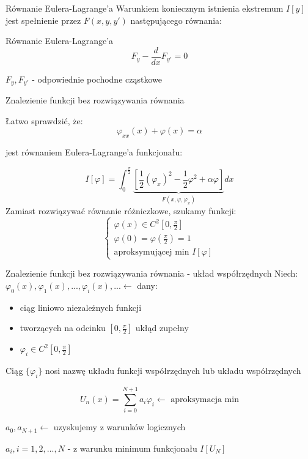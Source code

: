 
	\begin{frame}{Równanie Eulera-Lagrange'a}
		Warunkiem koniecznym istnienia ekstremum $I[y]$ jest spełnienie przez $F(x,y,y')$ następującego równania:
		
		\begin{block}{Równanie Eulera-Lagrange'a}
			$$
			F_y - \frac{d}{dx} F_{y'} = 0
			$$
			
			$F_y , F_{y'}$ - odpowiednie pochodne cząstkowe
		\end{block}
		
		
		
	\end{frame}


	\begin{frame}{Znalezienie funkcji bez rozwiązywania równania}
	
		Łatwo sprawdzić, że:
		$$
		\varphi_{xx}(x) + \varphi(x) = \alpha
		$$
				
		jest równaniem Eulera-Lagrange'a funkcjonału:
				
		$$
		I[\varphi] = \int_0^{\frac{\pi}{2}} \underbrace{[\frac{1}{2}(\varphi_x)^2 - \frac{1}{2}\varphi^2 + \alpha \varphi]}_{F(x,\varphi, \varphi_x)} dx
		$$
		Zamiast rozwiązywać równanie różniczkowe, szukamy funkcji:
		$$
		\begin{cases}
			\varphi(x) \in C^2[0, \frac{\pi}{2}] \\
			\varphi(0) = \varphi(\frac{\pi}{2}) = 1 \\
			\text{aproksymującej min } I[\varphi]
		\end{cases}
		$$		
	\end{frame}
	

	\begin{frame}{Znalezienie funkcji bez rozwiązywania równania - układ współrzędnych}
		Niech: $\varphi_0(x), \varphi_1(x), ... , \varphi_i(x), ... \leftarrow$ dany:
			\begin{itemize}
				\item ciąg liniowo niezależnych funkcji
				\item tworzących na odcinku $[0, \frac{\pi}{2}]$ ukłąd zupełny
				\item $\varphi_i \in C^2 [0, \frac{\pi}{2}]$
			\end{itemize}
			
			Ciąg $\{\varphi_i\}$ nosi nazwę układu funkcji współrzędnych lub układu współrzędnych
			
			$$
			U_n(x) = \sum_{i=0}^{N+1} a_i \varphi_i \leftarrow \text{ aproksymacja min}
			$$
			
			$a_0, a_{N+1} \leftarrow$ uzyskujemy z warunków logicznych
			
			$a_i, i = 1,2, ... , N$ - z warunku minimum funkcjonału $I[U_N]$
	
	\end{frame}

